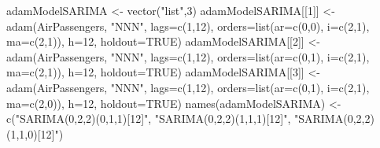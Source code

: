 \documentclass[
]{book}
\newenvironment{Shaded}{\begin{snugshade}}{\end{snugshade}}
\newcommand{\AttributeTok}[1]{\textcolor[rgb]{0.77,0.63,0.00}{#1}}
\newcommand{\ConstantTok}[1]{\textcolor[rgb]{0.00,0.00,0.00}{#1}}
\newcommand{\DecValTok}[1]{\textcolor[rgb]{0.00,0.00,0.81}{#1}}
\newcommand{\FunctionTok}[1]{\textcolor[rgb]{0.00,0.00,0.00}{#1}}
\newcommand{\NormalTok}[1]{#1}
\newcommand{\OtherTok}[1]{\textcolor[rgb]{0.56,0.35,0.01}{#1}}
\newcommand{\StringTok}[1]{\textcolor[rgb]{0.31,0.60,0.02}{#1}}
\theoremstyle{definition}
\theoremstyle{definition}
\theoremstyle{definition}
\theoremstyle{definition}
\theoremstyle{remark}
\begin{document}
\begin{Shaded}
\begin{Highlighting}[]
\NormalTok{adamModelSARIMA }\OtherTok{\textless{}{-}} \FunctionTok{vector}\NormalTok{(}\StringTok{"list"}\NormalTok{,}\DecValTok{3}\NormalTok{)}
\NormalTok{adamModelSARIMA[[}\DecValTok{1}\NormalTok{]] }\OtherTok{\textless{}{-}} \FunctionTok{adam}\NormalTok{(AirPassengers, }\StringTok{"NNN"}\NormalTok{, }\AttributeTok{lags=}\FunctionTok{c}\NormalTok{(}\DecValTok{1}\NormalTok{,}\DecValTok{12}\NormalTok{),}
                             \AttributeTok{orders=}\FunctionTok{list}\NormalTok{(}\AttributeTok{ar=}\FunctionTok{c}\NormalTok{(}\DecValTok{0}\NormalTok{,}\DecValTok{0}\NormalTok{), }\AttributeTok{i=}\FunctionTok{c}\NormalTok{(}\DecValTok{2}\NormalTok{,}\DecValTok{1}\NormalTok{),}
                                         \AttributeTok{ma=}\FunctionTok{c}\NormalTok{(}\DecValTok{2}\NormalTok{,}\DecValTok{1}\NormalTok{)),}
                             \AttributeTok{h=}\DecValTok{12}\NormalTok{, }\AttributeTok{holdout=}\ConstantTok{TRUE}\NormalTok{)}
\NormalTok{adamModelSARIMA[[}\DecValTok{2}\NormalTok{]] }\OtherTok{\textless{}{-}} \FunctionTok{adam}\NormalTok{(AirPassengers, }\StringTok{"NNN"}\NormalTok{, }\AttributeTok{lags=}\FunctionTok{c}\NormalTok{(}\DecValTok{1}\NormalTok{,}\DecValTok{12}\NormalTok{),}
                             \AttributeTok{orders=}\FunctionTok{list}\NormalTok{(}\AttributeTok{ar=}\FunctionTok{c}\NormalTok{(}\DecValTok{0}\NormalTok{,}\DecValTok{1}\NormalTok{), }\AttributeTok{i=}\FunctionTok{c}\NormalTok{(}\DecValTok{2}\NormalTok{,}\DecValTok{1}\NormalTok{),}
                                         \AttributeTok{ma=}\FunctionTok{c}\NormalTok{(}\DecValTok{2}\NormalTok{,}\DecValTok{1}\NormalTok{)),}
                             \AttributeTok{h=}\DecValTok{12}\NormalTok{, }\AttributeTok{holdout=}\ConstantTok{TRUE}\NormalTok{)}
\NormalTok{adamModelSARIMA[[}\DecValTok{3}\NormalTok{]] }\OtherTok{\textless{}{-}} \FunctionTok{adam}\NormalTok{(AirPassengers, }\StringTok{"NNN"}\NormalTok{, }\AttributeTok{lags=}\FunctionTok{c}\NormalTok{(}\DecValTok{1}\NormalTok{,}\DecValTok{12}\NormalTok{),}
                             \AttributeTok{orders=}\FunctionTok{list}\NormalTok{(}\AttributeTok{ar=}\FunctionTok{c}\NormalTok{(}\DecValTok{0}\NormalTok{,}\DecValTok{1}\NormalTok{), }\AttributeTok{i=}\FunctionTok{c}\NormalTok{(}\DecValTok{2}\NormalTok{,}\DecValTok{1}\NormalTok{),}
                                         \AttributeTok{ma=}\FunctionTok{c}\NormalTok{(}\DecValTok{2}\NormalTok{,}\DecValTok{0}\NormalTok{)),}
                             \AttributeTok{h=}\DecValTok{12}\NormalTok{, }\AttributeTok{holdout=}\ConstantTok{TRUE}\NormalTok{)}
\FunctionTok{names}\NormalTok{(adamModelSARIMA) }\OtherTok{\textless{}{-}} \FunctionTok{c}\NormalTok{(}\StringTok{"SARIMA(0,2,2)(0,1,1)[12]"}\NormalTok{,}
                            \StringTok{"SARIMA(0,2,2)(1,1,1)[12]"}\NormalTok{,}
                            \StringTok{"SARIMA(0,2,2)(1,1,0)[12]"}\NormalTok{)}
\end{Highlighting}
\end{Shaded}
\end{document}
